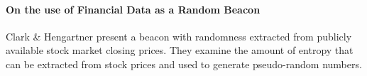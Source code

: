 \paragraph{On the use of Financial Data as a Random Beacon}
Clark \& Hengartner \cite{clark2010use} present a beacon with randomness extracted from publicly available stock market closing prices. They examine the amount of entropy that can be extracted from stock prices and used to generate pseudo-random numbers.  
